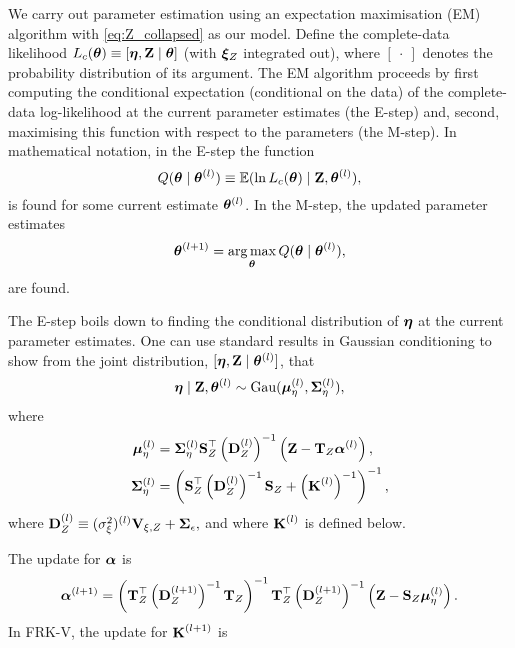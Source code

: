 We carry out parameter estimation using an expectation maximisation (EM) algorithm \citep[similar to][]{Katzfuss_2011,Nguyen_2014} with \eqref{eq:Z_collapsed} as our model. Define the complete-data likelihood $L_c({\boldsymbol{\theta}}) \equiv [\boldsymbol{\eta},\mathbf{Z} \mid {\boldsymbol{\theta}}]$ (with ${\boldsymbol{\xi}}_Z$ integrated out), where $[~\cdot~]$ denotes the probability distribution of its argument.  The EM algorithm proceeds by first computing the conditional expectation (conditional on the data) of the complete-data log-likelihood at the current parameter estimates (the E-step) and, second, maximising this function with respect to the parameters (the M-step). In mathematical notation, in the E-step the function
\begin{equation*}
Q({\boldsymbol{\theta}} \mid {\boldsymbol{\theta}}^{(l)}) \equiv {\mathbb{E}}(\ln L_c({\boldsymbol{\theta}}) \mid \mathbf{Z},{\boldsymbol{\theta}}^{(l)}),
\end{equation*}
is found for some current estimate ${\boldsymbol{\theta}}^{(l)}$. In the M-step, the updated parameter estimates
\begin{equation*}
{\boldsymbol{\theta}}^{(l+1)} = \operatorname*{arg\,max}_{\boldsymbol{\theta}} Q({\boldsymbol{\theta}} \mid {\boldsymbol{\theta}}^{(l)}),
\end{equation*}
are found.

The E-step boils down to finding the conditional distribution of $\boldsymbol{\eta}$ at the current parameter estimates. One can use standard results in Gaussian conditioning \citep[e.g., ][ Appendix A]{Rasmussen_2006}  to show from the joint distribution, $[\boldsymbol{\eta},\mathbf{Z} \mid {\boldsymbol{\theta}}^{(l)}]$, that
\begin{equation*}
\boldsymbol{\eta} \mid \mathbf{Z},{\boldsymbol{\theta}}^{(l)} \sim \mathrm{Gau}(\boldsymbol{\mu}_\eta^{(l)},{\bm \Sigma}_\eta^{(l)}),
\end{equation*}
where
\begin{align*}
\boldsymbol{\mu}_\eta^{(l)} &= {\bm \Sigma}_\eta^{(l)} \textbf{S}_Z^\top\left(\textbf{D}_Z^{(l)}\right)^{-1}\left(\mathbf{Z} - \textbf{T}_Z{\boldsymbol{\alpha}}^{(l)}\right), \\
{\bm \Sigma}_\eta^{(l)} &= \left(\textbf{S}_Z^\top\left(\textbf{D}_Z^{(l)}\right)^{-1}\textbf{S}_Z + \left(\textbf{K}^{(l)}\right)^{-1}\right)^{-1},
\end{align*}
where $\textbf{D}_Z^{(l)} \equiv (\sigma^2_\xi)^{(l)} \textbf{V}_{\xi,Z} + {\bm \Sigma}_\epsilon,$ and where $\textbf{K}^{(l)}$ is defined below.

The update for ${\boldsymbol{\alpha}}$ is
\begin{equation}
{\boldsymbol{\alpha}}^{(l+1)} = \left(\textbf{T}_Z^\top \left(\textbf{D}_Z^{(l+1)}\right)^{-1} \textbf{T}_Z\right)^{-1}\textbf{T}_Z^\top\left(\textbf{D}_Z^{(l+1)}\right)^{-1}\left(\mathbf{Z} - \textbf{S}_Z \boldsymbol{\mu}_\eta^{(l)}\right). \label{eq:alpha}
\end{equation}
In FRK-V, the update for $\textbf{K}^{(l+1)}$ is

